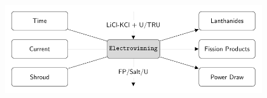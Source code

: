 \begin{frame}
\begin{columns}
\begin{column}{.5\textwidth}
\begin{figure}
			\label{fig:reduction}
		\end{figure}
		\begin{figure} 
			\centering
			\includegraphics[width=0.9\linewidth]{winning}
			\label{fig:winning}
		\end{figure}
	\end{column}
\end{columns} 
\end{frame}